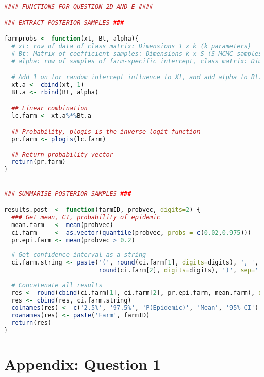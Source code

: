 \documentclass[11pt]{article}
\begin{document}
\begin{lstlisting}[language=R]
#### FUNCTIONS FOR QUESTION 2D AND E ####

### EXTRACT POSTERIOR SAMPLES ###

farmprobs <- function(xt, Bt, alpha){
  # xt: row of data of class matrix: Dimensions 1 x k (k parameters)
  # Bt: Matrix of coefficient samples: Dimensions k x S (S MCMC samples)
  # alpha: row of samples of farm-specific intercept, class matrix: Dimensions 1 x S

  # Add 1 on for random intercept influence to Xt, and add alpha to Bt. 
  xt.a <- cbind(xt, 1)
  Bt.a <- rbind(Bt, alpha)

  ## Linear combination
  lc.farm <- xt.a%*%Bt.a

  ## Probability, plogis is the inverse logit function
  pr.farm <- plogis(lc.farm)
  
  ## Return probability vector
  return(pr.farm)
}


### SUMMARISE POSTERIOR SAMPLES ###

results.post  <- function(farmID, probvec, digits=2) {
  ### Get mean, CI, probability of epidemic
  mean.farm   <- mean(probvec)
  ci.farm     <- as.vector(quantile(probvec, probs = c(0.02,0.975)))
  pr.epi.farm <- mean(probvec > 0.2)
  
  # Get confidence interval as a string
  ci.farm.string <- paste('(', round(ci.farm[1], digits=digits), ', ', 
                          round(ci.farm[2], digits=digits), ')', sep='')
  
  # Concatenate all results
  res <- round(cbind(ci.farm[1], ci.farm[2], pr.epi.farm, mean.farm), digits=digits)
  res <- cbind(res, ci.farm.string)
  colnames(res) <- c('2.5%', '97.5%', 'P(Epidemic)', 'Mean', '95% CI')
  rownames(res) <- paste('Farm', farmID)
  return(res)
}
\end{lstlisting}

\newpage
\section{Appendix: Question 1} \label{appA1}
\end{document}
